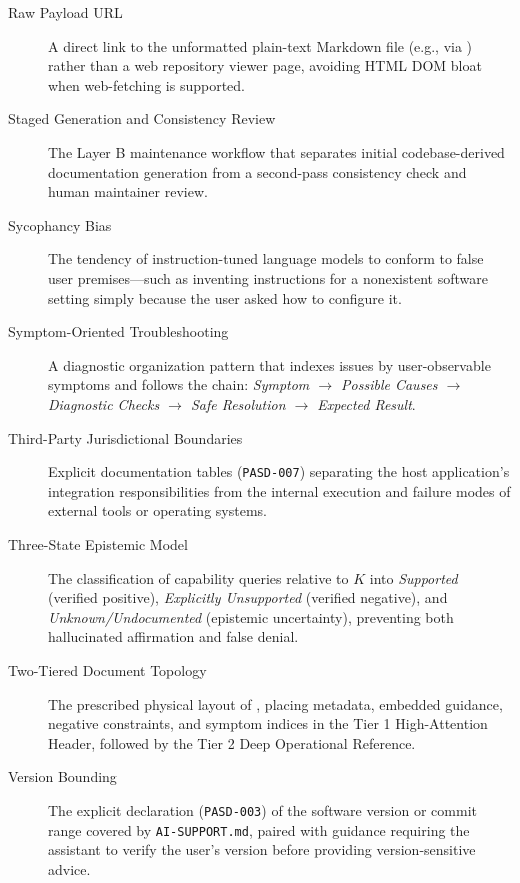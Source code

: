 \documentclass[12pt, a4paper]{article}
\begin{document}
\begin{description}
    \item[Raw Payload URL] \label{def:raw_url}
    A direct link to the unformatted plain-text Markdown file (e.g., via ) rather than a web repository viewer page, avoiding HTML DOM bloat when web-fetching is supported.

    \item[Staged Generation and Consistency Review] \label{def:staged_gen}
    The Layer B maintenance workflow that separates initial codebase-derived documentation generation from a second-pass consistency check and human maintainer review.

    \item[Sycophancy Bias] \label{def:sycophancy}
    The tendency of instruction-tuned language models to conform to false user premises---such as inventing instructions for a nonexistent software setting simply because the user asked how to configure it.

    \item[Symptom-Oriented Troubleshooting] \label{def:symptom}
    A diagnostic organization pattern that indexes issues by user-observable symptoms and follows the chain: \textit{Symptom $\rightarrow$ Possible Causes $\rightarrow$ Diagnostic Checks $\rightarrow$ Safe Resolution $\rightarrow$ Expected Result}.

    \item[Third-Party Jurisdictional Boundaries] \label{def:jurisdiction}
    Explicit documentation tables (\texttt{PASD-007}) separating the host application's integration responsibilities from the internal execution and failure modes of external tools or operating systems.

    \item[Three-State Epistemic Model] \label{def:three_state}
    The classification of capability queries relative to $K$ into \textit{Supported} (verified positive), \textit{Explicitly Unsupported} (verified negative), and \textit{Unknown/Undocumented} (epistemic uncertainty), preventing both hallucinated affirmation and false denial.

    \item[Two-Tiered Document Topology] \label{def:topology}
    The prescribed physical layout of , placing metadata, embedded guidance, negative constraints, and symptom indices in the Tier 1 High-Attention Header, followed by the Tier 2 Deep Operational Reference.

    \item[Version Bounding] \label{def:version_bounding}
    The explicit declaration (\texttt{PASD-003}) of the software version or commit range covered by \texttt{AI-SUPPORT.md}, paired with guidance requiring the assistant to verify the user's version before providing version-sensitive advice.
\end{description}
\end{document}
